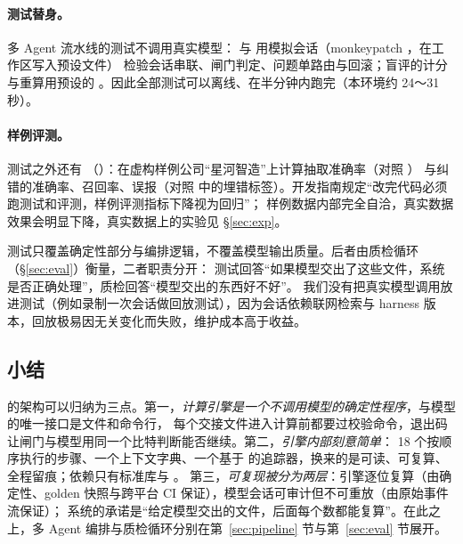 \paragraph{测试替身。}多 Agent 流水线的测试不调用真实模型： 与  用模拟会话（monkeypatch ，在工作区写入预设文件）
检验会话串联、闸门判定、问题单路由与回滚；盲评的计分与重算用预设的 。因此全部测试可以离线、在半分钟内跑完（本环境约 24～31 秒）。

\paragraph{样例评测。}测试之外还有 （）：在虚构样例公司“星河智造”上计算抽取准确率（对照 ）
与纠错的准确率、召回率、误报（对照  中的埋错标签）。开发指南规定“改完代码必须跑测试和评测，样例评测指标下降视为回归”；
样例数据内部完全自洽，真实数据效果会明显下降，真实数据上的实验见 \S\ref{sec:exp}。

\begin{tradeoff}[：测试覆盖什么]
测试只覆盖确定性部分与编排逻辑，不覆盖模型输出质量。后者由质检循环（\S\ref{sec:eval}）衡量，二者职责分开：
测试回答“如果模型交出了这些文件，系统是否正确处理”，质检回答“模型交出的东西好不好”。
我们没有把真实模型调用放进测试（例如录制一次会话做回放测试），因为会话依赖联网检索与 harness 版本，回放极易因无关变化而失败，维护成本高于收益。
\end{tradeoff}

\subsection{小结}
\label{sec:arch-summary}

\sysname{} 的架构可以归纳为三点。第一，\emph{计算引擎是一个不调用模型的确定性程序}，与模型的唯一接口是文件和命令行，
每个交接文件进入计算前都要过校验命令，退出码让闸门与模型用同一个比特判断能否继续。第二，\emph{引擎内部刻意简单}：
18 个按顺序执行的步骤、一个上下文字典、一个基于  的追踪器，换来的是可读、可复算、全程留痕；依赖只有标准库与 。
第三，\emph{可复现被分为两层}：引擎逐位复算（由确定性、golden 快照与跨平台 CI 保证），模型会话可审计但不可重放（由原始事件流保证）；
系统的承诺是“给定模型交出的文件，后面每个数都能复算”。在此之上，多 Agent 编排与质检循环分别在第~\ref{sec:pipeline} 节与第~\ref{sec:eval} 节展开。

\fussy
